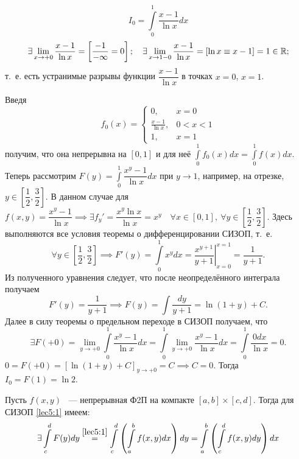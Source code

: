 \documentclass[../../main.tex]{subfiles}
\begin{document}
\begin{exmp}
	\[I_0 = \int\limits_0^1 \dfrac{x - 1}{\ln x} dx\]
	\[ \exists \lim\limits_{x \to +0} \dfrac{x - 1}{\ln x} = \left[
	\dfrac{-1}{-\infty} = 0
	\right]; \quad 
	\exists \lim\limits_{x \to 1 - 0} \dfrac{x - 1}{\ln x} = \left[\ln x \equiv 
	\\
	x - 1\right] = 1 \in \mathbb{R};\] т.~е. есть устранимые разрывы функции
	$\dfrac{x - 1}{\ln x}$ в точках $x = 0$, $x = 1$.
	
	Введя \[ f_0(x) = 
	\begin{cases}
		0,& x = 0\\
		\frac{x - 1}{\ln x},& 0 < x < 1\\
		1,& x = 1
	\end{cases}\] получим, что она непрерывна на $ [0, 1] $ и для неё 
	$ \displaystyle\int\limits_0^1 f_0(x) dx = \displaystyle\int\limits_0^1 f(x) 
	dx $.
	Теперь рассмотрим $ F(y) = \displaystyle\int\limits_0^1 \dfrac{x^y - 1}{\ln 
	x} dx $
	при $ y \to 1 $, например, на отрезке, $y \in \left[
	\dfrac{1}{2}, \dfrac{3}{2}
	\right] $. В данном случае для $ f(x, y) = \dfrac{x^y - 1}{\ln x} \implies 
	\exists f_y' = \dfrac{x^y \ln x}{\ln x} = x^y \quad \forall x \in [0, 1],\
	\forall y \in \left[
	\dfrac{1}{2}, \dfrac{3}{2}
	\right] $. Здесь выполняются все условия теоремы о дифференцировании СИЗОП,
	т.~е.\[ \forall y \in \left[\dfrac{1}{2}, \dfrac{3}{2}\right] \implies 
	F'(y) = \displaystyle\int\limits_0^1 x^y dx = \left.\dfrac{x^{y + 1}}{y + 
	1}\right|_{x=0}^{x=1} = \dfrac{1}{y + 1}
	.\] Из полученного уравнения следует, что после
	неопределённого интеграла получаем \[F'(y) = \dfrac{1}{y + 1} \implies F(y) = 
	\int \dfrac{dy}{y + 1} = 
	\ln(1 + y) + C.\] Далее в силу теоремы о предельном переходе в СИЗОП 
	получаем, что
	\[\exists F(+0) = \lim\limits_{y \to +0} \int\limits_0^1 
	\dfrac{x^y - 1}{\ln x} dx = \int\limits_0^1 \lim\limits_{y \to +0} 
	\dfrac{x^y - 1}{\ln x} dx = \int\limits_0^1 \dfrac{0dx}{\ln x} = 0.\]
	$ 0 = F(+0) = \left[\ln(1 + y) + C\right]_{y \to +0} = C \implies C = 0 $.
	Тогда $ I_0 = F(1) = \ln 2 $.
\end{exmp}
\begin{thm}
	Пусть $ f(x, y) $ ~--- непрерывная Ф2П на компакте $ [a, b] \times [c, d]$.
	Тогда для СИЗОП \eqref{lec5:1} имеем:
	\begin{equation}
		\exists \int\limits_c^d F(y) dy \stackrel{\eqref{lec5:1}}{=} 
		\int\limits_c^d \left(
		\int\limits_a^b f(x, y) dx
		\right) dy = 
		\int\limits_a^b \left(
		\int\limits_c^d f(x, y) dy
		\right) dx
	\end{equation}
\end{thm}
\end{document}
